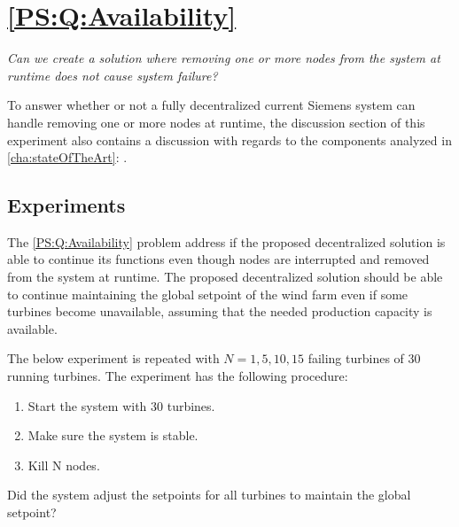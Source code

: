 \section{\ref{PS:Q:Availability}}

\textit{Can we create a solution where removing one or more nodes from the system at runtime does not cause system failure?}\newline\newline

\noindent To answer whether or not a fully decentralized current Siemens system can handle removing one or more nodes at runtime, the discussion section of this experiment also contains a discussion with regards to the components analyzed in \cref{cha:stateOfTheArt}: .

\subsection{Experiments}
The \ref{PS:Q:Availability} problem address if the proposed decentralized solution is able to continue its functions even though nodes are interrupted and removed from the system at runtime.
The proposed decentralized solution should be able to continue maintaining the global setpoint of the wind farm even if some turbines become unavailable, assuming that the needed production capacity is available.

The below experiment is repeated with $N = 1, 5, 10, 15$ failing turbines of 30 running turbines.
%
The experiment has the following procedure:
\begin{enumerate}
	\item Start the system with 30 turbines.
	\item Make sure the system is stable.
	\item Kill N nodes.
\end{enumerate}

Did the system adjust the setpoints for all turbines to maintain the global setpoint?

